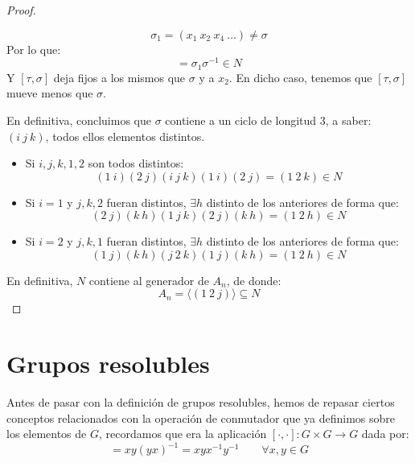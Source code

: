 \begin{teo}[de Abel]
\begin{proof}
\begin{enumerate}
\begin{equation*}
                    \sigma_1 = (x_1\ x_2\ x_4\ \ldots) \neq \sigma
                \end{equation*}
                Por lo que:
                \begin{equation*}
                    [\tau, \sigma] = \sigma_1 \sigma^{-1} \in N
                \end{equation*}
                Y $[\tau, \sigma]$ deja fijos a los mismos que $\sigma$ y a $x_2$. En dicho caso, tenemos que $[\tau, \sigma]$ mueve menos que $\sigma$.
        \end{enumerate}
        En definitiva, concluimos que $\sigma$ contiene a un ciclo de longitud 3, a saber: $(i\ j\ k)$, todos ellos elementos distintos.

        \begin{itemize}
            \item Si $i,j,k,1,2$ son todos distintos:
                \begin{equation*}
                    (1\ i)(2\ j)(i\ j\ k)(1\ i)(2\ j) = (1\ 2\ k) \in N
                \end{equation*}
            \item Si $i = 1$ y $j, k, 2$ fueran distintos, $\exists h$ distinto de los anteriores de forma que:
                \begin{equation*}
                    (2\ j)(k\ h)(1\ j\ k)(2\ j)(k\ h) = (1\ 2\ h) \in N
                \end{equation*}
            \item Si $i = 2$ y $j, k, 1$ fueran distintos, $\exists h$ distinto de los anteriores de forma que:
                \begin{equation*} 
                    (1\ j)(k\ h)(j\ 2\ k)(1\ j)(k\ h) = (1\ 2\ h) \in N
                \end{equation*}
        \end{itemize}
        En definitiva, $N$ contiene al generador de $A_n$, de donde:
        \begin{equation*}
            A_n = \langle (1\ 2\ j) \rangle  \subseteq N
        \end{equation*}
    \end{proof}
\end{teo}

\section{Grupos resolubles}
Antes de pasar con la definición de grupos resolubles, hemos de repasar ciertos conceptos relacionados con la operación de conmutador que ya definimos sobre los elementos de $G$, recordamos que era la aplicación $[\cdot ,\cdot ]:G\times G\to G$ dada por:
\begin{equation*}
    [x,y] = xy{(yx)}^{-1} = xyx^{-1}y^{-1} \qquad \forall x,y\in G
\end{equation*}

